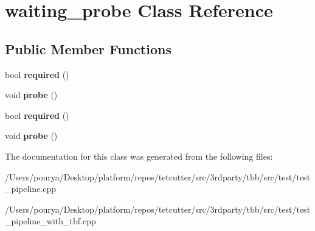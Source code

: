\hypertarget{classwaiting__probe}{}\section{waiting\+\_\+probe Class Reference}
\label{classwaiting__probe}
\subsection*{Public Member Functions}
\begin{DoxyCompactItemize}
\item 
\hypertarget{classwaiting__probe_a2e09e78c7006538df9c0bc661370a735}{}bool {\bfseries required} ()\label{classwaiting__probe_a2e09e78c7006538df9c0bc661370a735}

\item 
\hypertarget{classwaiting__probe_ab68f28f7ac10c7e427a43b239ee4468f}{}void {\bfseries probe} ()\label{classwaiting__probe_ab68f28f7ac10c7e427a43b239ee4468f}

\item 
\hypertarget{classwaiting__probe_a2e09e78c7006538df9c0bc661370a735}{}bool {\bfseries required} ()\label{classwaiting__probe_a2e09e78c7006538df9c0bc661370a735}

\item 
\hypertarget{classwaiting__probe_ab68f28f7ac10c7e427a43b239ee4468f}{}void {\bfseries probe} ()\label{classwaiting__probe_ab68f28f7ac10c7e427a43b239ee4468f}

\end{DoxyCompactItemize}


The documentation for this class was generated from the following files\+:\begin{DoxyCompactItemize}
\item 
/\+Users/pourya/\+Desktop/platform/repos/tetcutter/src/3rdparty/tbb/src/test/test\+\_\+pipeline.\+cpp\item 
/\+Users/pourya/\+Desktop/platform/repos/tetcutter/src/3rdparty/tbb/src/test/test\+\_\+pipeline\+\_\+with\+\_\+tbf.\+cpp\end{DoxyCompactItemize}
